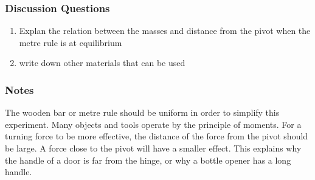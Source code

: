 \subsubsection*{Discussion Questions}
\begin{enumerate}
\item{Explan the relation between the masses and distance from the pivot when the metre rule is at equilibrium}
\item{write down other materials that can be used}
\end{enumerate}

\subsubsection*{Notes}
The wooden bar or metre rule should be uniform in order to simplify this experiment.
Many objects and tools operate by the principle of moments.  For a turning force to be more effective, the distance of the force from the pivot should be large.  A force close to the pivot will have a smaller effect.  This explains why the handle of a door is far from the hinge, or why a bottle opener has a long handle.

